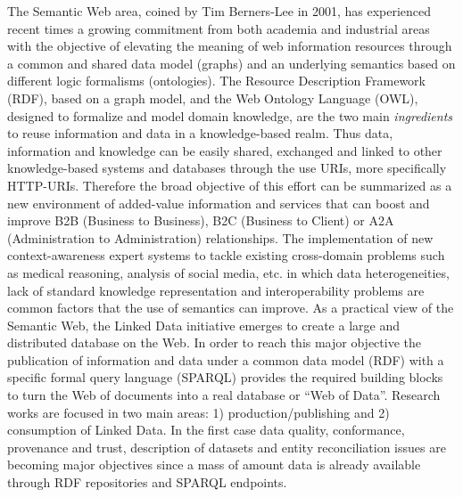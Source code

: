 The Semantic Web area, coined by Tim Berners-Lee in 2001, has experienced recent times a growing 
commitment from both academia and industrial areas  with the objective of elevating the meaning of web 
information resources through a common and shared data model (graphs) and an underlying semantics based 
on different logic formalisms (ontologies). The Resource Description Framework (RDF), based on a graph model, and the Web Ontology Language (OWL), 
designed to formalize and model domain knowledge, are the two main \textit{ingredients} to reuse information and data 
in a knowledge-based realm. Thus data, information and knowledge can be easily shared, exchanged and linked 
to other knowledge-based systems and databases through the use URIs, more specifically HTTP-URIs. Therefore the broad objective of this effort can be summarized 
as a new environment of added-value information and services that can boost and improve B2B (Business to Business), B2C (Business to Client) or 
A2A (Administration to Administration) relationships. The implementation of new context-awareness expert systems to tackle existing 
cross-domain problems such as medical reasoning, analysis of social media, etc. in which data heterogeneities, 
lack of standard knowledge representation and interoperability problems are common factors that the use of semantics can improve. As a practical view of the Semantic Web, 
the Linked Data initiative emerges to create a large and distributed database on the Web. In order to reach this major objective the publication of information and data under a common data model (RDF) 
with a specific formal query language (SPARQL) provides the required building blocks to turn the Web of documents 
into a real database or ``Web of Data''. Research works are focused in two main areas: 1) production/publishing and 2) consumption of 
Linked Data. In the first case data quality, conformance, provenance and trust, description of datasets and entity reconciliation issues 
are becoming major objectives since a mass of amount data is already available through RDF repositories and SPARQL endpoints. 

